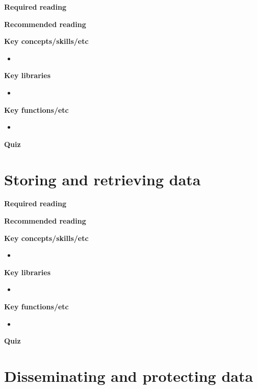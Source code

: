 \documentclass[
]{book}
\begin{document}
\textbf{Required reading}

\textbf{Recommended reading}

\textbf{Key concepts/skills/etc}

\begin{itemize}
\item
\end{itemize}

\textbf{Key libraries}

\begin{itemize}
\item
\end{itemize}

\textbf{Key functions/etc}

\begin{itemize}
\item
\end{itemize}

\textbf{Quiz}

\hypertarget{storing-and-retrieving-data}{%
\chapter{Storing and retrieving data}\label{storing-and-retrieving-data}}

\textbf{Required reading}

\textbf{Recommended reading}

\textbf{Key concepts/skills/etc}

\begin{itemize}
\item
\end{itemize}

\textbf{Key libraries}

\begin{itemize}
\item
\end{itemize}

\textbf{Key functions/etc}

\begin{itemize}
\item
\end{itemize}

\textbf{Quiz}

\hypertarget{disseminating-and-protecting-data}{%
\chapter{Disseminating and protecting data}\label{disseminating-and-protecting-data}}
\end{document}
